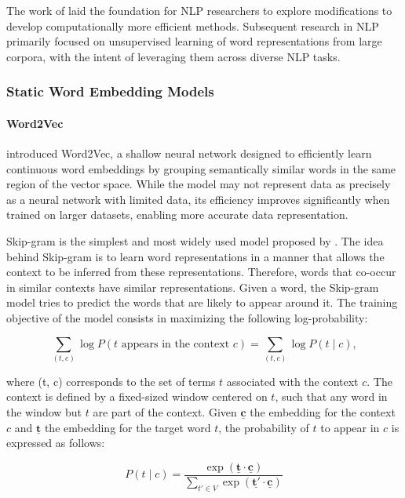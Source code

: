 The work of \citet{bengio2000neural} laid the foundation for \ac{NLP} researchers to explore modifications to develop computationally more efficient methods. Subsequent research in \ac{NLP} primarily focused on unsupervised learning of word representations from large corpora, with the intent of leveraging them across diverse \ac{NLP} tasks.


\subsubsection{Static Word Embedding Models} 

\paragraph{Word2Vec}

\citet{mikolov2013efficient} introduced Word2Vec, a shallow neural network designed to efficiently learn continuous word embeddings by grouping semantically similar words in the same region of the vector space. While the model may not represent data as precisely as a neural network with limited data, its efficiency improves significantly when trained on larger datasets, enabling more accurate data representation. 

Skip-gram is the simplest and most widely used model proposed by \citet{mikolov2013efficient}. The idea behind Skip-gram is to learn word representations in a manner that allows the context to be inferred from these representations. Therefore, words that co-occur in similar contexts have similar representations. Given a word, the Skip-gram model tries to predict the words that are likely to appear around it. The training objective of the model consists in maximizing the following log-probability:

\begin{equation}
    \sum_{(t, c)} \log P(t \text{ appears in the context } c) = \sum_{(t, c)} \log P(t \mid c),
\end{equation}

\noindent where (t, c) corresponds to the set of terms $t$ associated with the context $c$. The context is defined by a fixed-sized window centered on $t$, such that any word in the window but $t$ are part of the context. Given $\bm{\underline{c}}$ the embedding for the context $c$ and $\bm{\underline{t}}$ the embedding for the target word $t$, the probability of $t$ to appear in $c$ is expressed as follows:

\begin{equation}
    P(t \mid c) = \frac{\exp (\bm{\underline{t}} \cdot \bm{\underline{c}})}{\sum_{t' \in V} \exp (\bm{\underline{t'}} \cdot \bm{\underline{c}})}
\end{equation}

